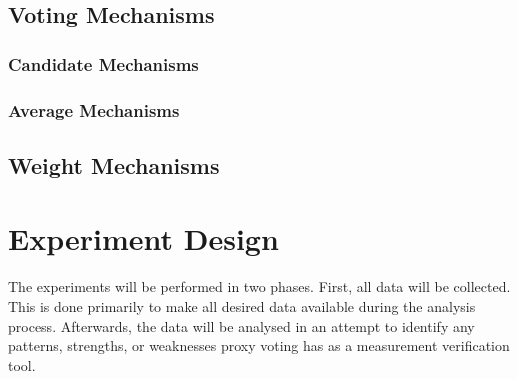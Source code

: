 \subsection{Voting Mechanisms}\label{subsec:voting-mechanisms}

\subsubsection{Candidate Mechanisms}\label{subsubsec:candidate-mechanisms}
%

\subsubsection{Average Mechanisms}\label{subsubsec:average-mechanisms}
%

\subsection{Weight Mechanisms}\label{subsec:weight-mechanisms}
%


\section{Experiment Design}\label{sec:experiment-design}
%
%

The experiments will be performed in two phases.
First, all data will be collected.
This is done primarily to make all desired data available during the analysis
process.
Afterwards, the data will be analysed in an attempt to identify any patterns,
strengths, or weaknesses proxy voting has as a measurement verification tool.

